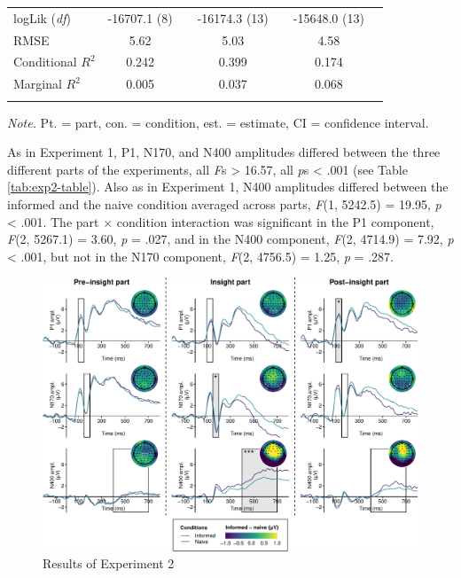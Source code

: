 \documentclass[
  english,
  man,floatsintext]{apa7}
\begin{document}
\begin{table}[tbp]
\begin{center}
\begin{threeparttable}
{\begin{tabular}{lcccccc}
logLik (\textit{df}) & -16707.1 (8) &  & -16174.3 (13) &  & -15648.0 (13) & \\
RMSE & 5.62 &  & 5.03 &  & 4.58 & \\
Conditional $R^2$ & 0.242 &  & 0.399 &  & 0.174 & \\
Marginal $R^2$ & 0.005 &  & 0.037 &  & 0.068 & \\
\bottomrule
\addlinespace
\end{tabular}

}

\begin{tablenotes}[para]
\normalsize{\textit{Note.} Pt. = part, con. = condition, est. = estimate, CI = confidence interval.}
\end{tablenotes}

\end{threeparttable}
\end{center}

\end{table}

As in Experiment 1, P1, N170, and N400 amplitudes differed between the three different parts of the experiments, all \emph{F}s \textgreater{} 16.57, all \emph{p}s \textless{} .001 (see Table \ref{tab:exp2-table}). Also as in Experiment 1, N400 amplitudes differed between the informed and the naive condition averaged across parts, \emph{F}(1, 5242.5) = 19.95, \emph{p} \textless{} .001. The part × condition interaction was significant in the P1 component, \emph{F}(2, 5267.1) = 3.60, \emph{p} = .027, and in the N400 component, \emph{F}(2, 4714.9) = 7.92, \emph{p} \textless{} .001, but not in the N170 component, \emph{F}(2, 4756.5) = 1.25, \emph{p} = .287.

\begin{figure}

{\centering \includegraphics[width=1\linewidth]{manuscript_files/figure-latex/exp2-plot-1} 

}

\caption{Results of Experiment 2\smallskip}\label{fig:exp2-plot}
\end{figure}
\end{document}
